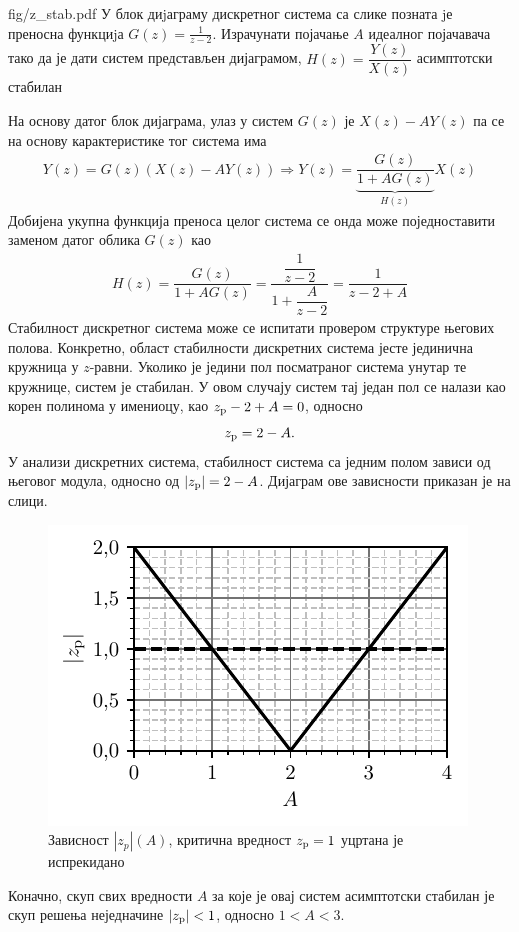 \begin{slikaDesno}{fig/z_stab.pdf}
    \PID У блок диjаграму дискретног система са слике позната jе преносна функциjа
    $G(z) = \frac{1}{z - 2}$. Израчунати појачање $A$ идеалног појачавача тако да је 
    дати систем представљен дијаграмом, $H(z) = \dfrac{Y(z)}{X(z)}$ асимптотски стабилан
\end{slikaDesno}

\RESENJE
На основу датог блок дијаграма, улаз у систем $G(z)$ је $X(z) - AY(z)$ па се на основу карактеристике тог система има 
\begin{eqnarray}
    Y(z) = G(z) \left( X(z) - AY(z) \right) \Rightarrow Y(z) = \underbrace{\dfrac{G(z)}{ 1 + AG(z) }}_{H(z)} X(z) 
\end{eqnarray}
Добијена укупна функција преноса целог система се онда може поједноставити заменом датог облика $G(z)$ као 
\begin{eqnarray}
    H(z) = \dfrac{G(z)}{ 1 + AG(z) }
         = \dfrac{\dfrac{1}{z - 2}}{1 + \dfrac{A}{z - 2}} 
         = \dfrac{1}{z - 2 + A}
\end{eqnarray}
Стабилност дискретног система може се испитати провером структуре његових полова. 
Конкретно, област стабилности дискретних система јесте јединична кружница у $z$-равни.
Уколико је једини пол посматраног система унутар те кружнице, систем је стабилан. У овом случају систем тај један пол
се налази као корен полинома у имениоцу, као $z_{\rm p} - 2 + A = 0$, односно 
\begin{equation}
    z_{\rm p} = 2-A.
\end{equation} У анализи дискретних система, стабилност система са једним полом зависи
од његовог модула, односно од $|z_{\rm p}| = 2-A$. Дијаграм ове зависности приказан је на слици. 
\begin{figure}[ht!]
    \centering
    \includegraphics{fig/z_mod.pdf}
    \caption{Зависност $|z_{p}|(A)$, критична вредност $z_{\rm p} = 1$ уцртана је испрекидано }
\end{figure}

Коначно, скуп свих вредности $A$ за које је овај систем асимптотски стабилан је скуп решења неједначине $|z_{\rm p}|<1$, односно 
$1 < A < 3$. 
